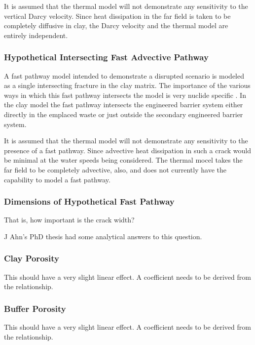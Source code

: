 It is assumed that the thermal model will not demonstrate any
sensitivity to the vertical Darcy velocity. Since heat dissipation in the far 
field is taken to be completely diffusive in clay, the Darcy velocity and the 
thermal model are entirely independent.

\clearpage

\subsubsection{Hypothetical Intersecting Fast Advective Pathway}

A fast pathway model intended to demonstrate a disrupted scenario is modeled as 
a single intersecting fracture in the clay matrix. The importance of the various 
ways in which this fast pathway intersects the model is very nuclide specific 
\cite{clayton_generic_2011}. In the clay model the fast pathway intersects the 
engineered barrier system either directly in the emplaced waste or just outside 
the secondary engineered barrier system.

It is assumed that the thermal model will not demonstrate any
sensitivity to the presence of a fast pathway. Since advective heat dissipation 
in such a crack would be minimal at the water speeds being considered. The 
thermal mocel takes the far field to be completely advective, also, and does not 
currently have the capability to model a fast pathway.

\subsubsection{Dimensions of Hypothetical Fast Pathway}

That is, how important is the crack width?

J Ahn's PhD  thesis had some analytical answers to this question.

\subsubsection{Clay Porosity}

This should have a very slight linear effect. A coefficient needs to be derived 
from the relationship.

\subsubsection{Buffer Porosity}

This should have a very slight linear effect. A coefficient needs to be derived 
from the relationship.

